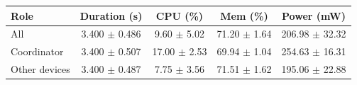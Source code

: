\begin{tabular}{lcccc}
\hline
\textbf{Role} & \textbf{Duration (s)} & \textbf{CPU (\%)} & \textbf{Mem (\%)} & \textbf{Power (mW)} \\
\hline
All & 3.400 $\pm$ 0.486 & 9.60 $\pm$ 5.02 & 71.20 $\pm$ 1.64 & 206.98 $\pm$ 32.32 \\
Coordinator & 3.400 $\pm$ 0.507 & 17.00 $\pm$ 2.53 & 69.94 $\pm$ 1.04 & 254.63 $\pm$ 16.31 \\
Other devices & 3.400 $\pm$ 0.487 & 7.75 $\pm$ 3.56 & 71.51 $\pm$ 1.62 & 195.06 $\pm$ 22.88 \\
\hline
\end{tabular}
